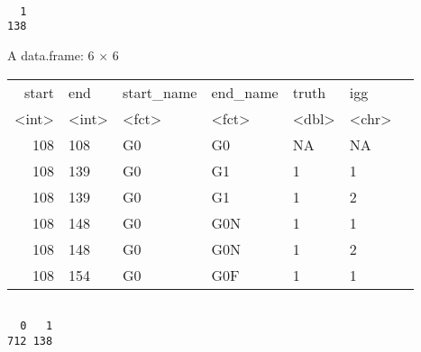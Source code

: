 \documentclass[11pt]{article}
\begin{document}
    
    
    \begin{verbatim}

  1 
138 
    \end{verbatim}

    
    A data.frame: 6 × 6
\begin{tabular}{r|llllll}
 start & end & start\_name & end\_name & truth & igg\\
 <int> & <int> & <fct> & <fct> & <dbl> & <chr>\\
\hline
	 108 & 108 & G0 & G0  & NA & NA\\
	 108 & 139 & G0 & G1  &  1 & 1 \\
	 108 & 139 & G0 & G1  &  1 & 2 \\
	 108 & 148 & G0 & G0N &  1 & 1 \\
	 108 & 148 & G0 & G0N &  1 & 2 \\
	 108 & 154 & G0 & G0F &  1 & 1 \\
\end{tabular}


    
    
    \begin{verbatim}

  0   1 
712 138 
    \end{verbatim}
\end{document}
